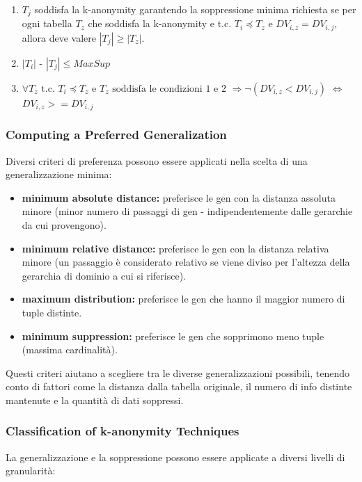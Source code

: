 \documentclass{report}
\begin{document}
\begin{enumerate}
    \item \( T_j \) soddisfa la k-anonymity garantendo la soppressione minima richiesta se per ogni tabella \( T_z \) che soddisfa la k-anonymity e t.c. \( T_i \preceq T_z \) e \( DV_{i,z} = DV_{i,j} \), allora deve valere \( |T_j| \geq |T_z| \).
    \item \( |T_i| \text{ - } |T_j| \leq MaxSup \)
    \item \( \forall T_z \text{ t.c. } T_i \preceq T_z \text{ e } T_z \text{ soddisfa le condizioni 1 e 2 } \Rightarrow \neg(DV_{i,z} < DV_{i,j}) \) $ \iff $ \(DV_{i,z} >= DV_{i,j} \)
\end{enumerate}

\subsubsection{Computing a Preferred Generalization}
Diversi criteri di preferenza possono essere applicati nella scelta di una generalizzazione minima:

\begin{itemize}
    \item \textbf{minimum absolute distance:} preferisce le gen con la distanza assoluta minore (minor numero di passaggi di gen - indipendentemente dalle gerarchie da cui provengono).
    \item \textbf{minimum relative distance:} preferisce le gen con la distanza relativa minore (un passaggio è considerato relativo se viene diviso per l'altezza della gerarchia di dominio a cui si riferisce).
    \item \textbf{maximum distribution:} preferisce le gen che hanno il maggior numero di tuple distinte.
    \item \textbf{minimum suppression:} preferisce le gen che sopprimono meno tuple (massima cardinalità).
\end{itemize}

\noindent Questi criteri aiutano a scegliere tra le diverse generalizzazioni possibili, tenendo conto di fattori come la distanza dalla tabella originale, il numero di info distinte mantenute e la quantità di dati soppressi.

\subsubsection{Classification of k-anonymity Techniques}
La generalizzazione e la soppressione possono essere applicate a diversi livelli di granularità:
\end{document}
